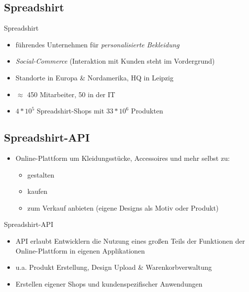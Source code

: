 \subsection{Spreadshirt}
\begin{frame}{Spreadshirt}
    \begin{itemize}
        \item führendes Unternehmen für \emph{personalisierte Bekleidung}
        \item \emph{Social-Commerce} (Interaktion mit Kunden steht im Vordergrund) %
        \item Standorte in Europa \& Nordamerika, HQ in Leipzig
        \item $\approx$ 450 Mitarbeiter, 50 in der IT
        \item $4*10^5$ Spreadshirt-Shops mit $33*10^6$ Produkten
    \end{itemize}
\end{frame}

\subsection{Spreadshirt-API}
\begin{frame}[squeeze]
    \begin{itemize}
        \item Online-Plattform um Kleidungsstücke, Accessoires und mehr selbst zu:
        \begin{itemize}
            \item gestalten
            \item kaufen
            \item zum Verkauf anbieten (eigene Designs als Motiv oder Produkt)
        \end{itemize}
    \end{itemize}

    \begin{block}{Spreadshirt-API}
        \begin{itemize}
            \item API erlaubt Entwicklern die Nutzung eines großen Teils der Funktionen der Online-Plattform in eigenen Applikationen
            \item u.a. Produkt Erstellung, Design Upload \& Warenkorbverwaltung
            \item Erstellen eigener Shops und kundenspezifischer Anwendungen %
        \end{itemize}
    \end{block}
\end{frame}

